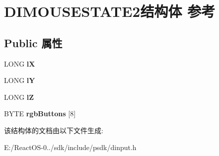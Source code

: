\hypertarget{struct_d_i_m_o_u_s_e_s_t_a_t_e2}{}\section{D\+I\+M\+O\+U\+S\+E\+S\+T\+A\+T\+E2结构体 参考}
\label{struct_d_i_m_o_u_s_e_s_t_a_t_e2}
\subsection*{Public 属性}
\begin{DoxyCompactItemize}
\item 
\mbox{\label{struct_d_i_m_o_u_s_e_s_t_a_t_e2_ad0a6f408cfb1618e755d1bfa84259a09}} 
L\+O\+NG {\bfseries lX}
\item 
\mbox{\label{struct_d_i_m_o_u_s_e_s_t_a_t_e2_a77650ba535b36b329d47567bc389ee18}} 
L\+O\+NG {\bfseries lY}
\item 
\mbox{\label{struct_d_i_m_o_u_s_e_s_t_a_t_e2_af6eb100917ae435be09b8f2e3965742d}} 
L\+O\+NG {\bfseries lZ}
\item 
\mbox{\label{struct_d_i_m_o_u_s_e_s_t_a_t_e2_abafbe8f36d8dbf2795618938d5c3d5c4}} 
B\+Y\+TE {\bfseries rgb\+Buttons} \mbox{[}8\mbox{]}
\end{DoxyCompactItemize}


该结构体的文档由以下文件生成\+:\begin{DoxyCompactItemize}
\item 
E\+:/\+React\+O\+S-\/0../sdk/include/psdk/dinput.\+h\end{DoxyCompactItemize}
